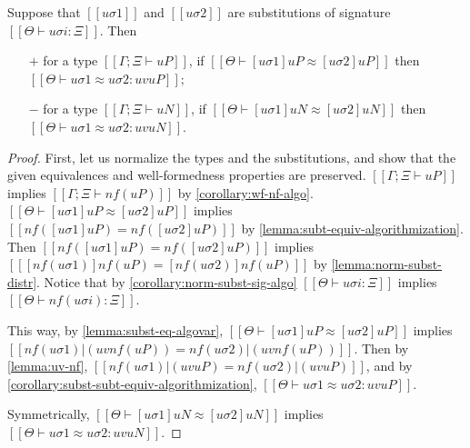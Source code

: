 \begin{corollary}
  \label{lemma:subst-equiv-algovar}
  Suppose that $[[uσ1]]$ and $[[uσ2]]$ are substitutions 
  of signature $[[Θ ⊢ uσi : Ξ]]$.
  Then 
  \begin{enumerate}
    \item [$+$] for a type $[[Γ; Ξ ⊢ uP]]$, if $[[Θ ⊢ [uσ1]uP ≈ [uσ2]uP]]$ then
      $[[Θ ⊢ uσ1 ≈ uσ2 : uv uP]]$;
    \item [$-$] for a type $[[Γ; Ξ ⊢ uN]]$, if $[[Θ ⊢ [uσ1]uN ≈ [uσ2]uN]]$ then
      $[[Θ ⊢ uσ1 ≈ uσ2 : uv uN]]$.
  \end{enumerate}
\end{corollary}
\begin{proof}
  First, let us normalize the types and the substitutions, and show that
  the given equivalences and well-formedness properties are preserved. 
  $[[Γ; Ξ ⊢ uP]]$ implies $[[Γ; Ξ ⊢ nf(uP)]]$ by \cref{corollary:wf-nf-algo}.
  $[[Θ ⊢ [uσ1]uP ≈ [uσ2]uP]]$ implies $[[ nf([uσ1]uP) = nf([uσ2]uP)]]$ by 
  \cref{lemma:subt-equiv-algorithmization}.
  Then $[[ nf([uσ1]uP) = nf([uσ2]uP)]]$ implies 
  $[[ [nf(uσ1)]nf(uP) = [nf(uσ2)]nf(uP)]]$ by \cref{lemma:norm-subst-distr}.
  Notice that by \cref{corollary:norm-subst-sig-algo}
  $[[Θ ⊢ uσi : Ξ]]$ implies $[[Θ ⊢ nf(uσi) : Ξ]]$.

  This way, by \cref{lemma:subst-eq-algovar}, 
  $[[Θ ⊢ [uσ1]uP ≈ [uσ2]uP]]$ implies 
  $[[nf(uσ1)|(uv nf(uP)) = nf(uσ2)|(uv nf(uP))]]$.
  Then by \cref{lemma:uv-nf}, 
  $[[nf(uσ1)|(uv uP) = nf(uσ2)|(uv uP)]]$,
  and by \cref{corollary:subst-subt-equiv-algorithmization},
  $[[Θ ⊢ uσ1 ≈ uσ2 : uv uP]]$.

  Symmetrically, 
  $[[Θ ⊢ [uσ1]uN ≈ [uσ2]uN]]$ implies 
  $[[Θ ⊢ uσ1 ≈ uσ2 : uv uN]]$.
\end{proof}
